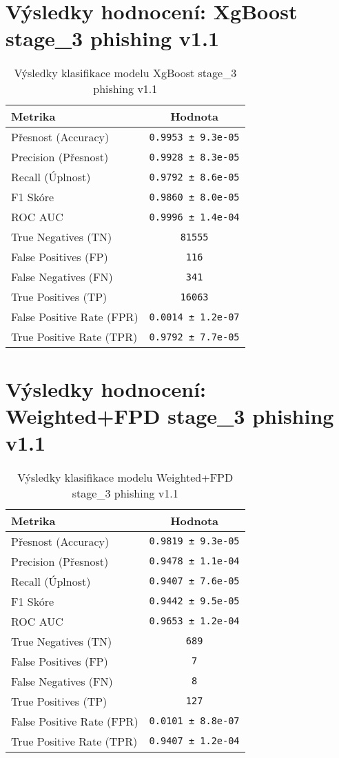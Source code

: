 \section*{Výsledky hodnocení: XgBoost stage_3 phishing v1.1}
\begin{table}[h!]
\centering
\begin{tabular}{|l|c|}
\hline
\textbf{Metrika} & \textbf{Hodnota} \\
\hline
Přesnost (Accuracy) & \texttt{0.9953 ± 9.3e-05} \\
Precision (Přesnost) & \texttt{0.9928 ± 8.3e-05} \\
Recall (Úplnost) & \texttt{0.9792 ± 8.6e-05} \\
F1 Skóre & \texttt{0.9860 ± 8.0e-05} \\
ROC AUC & \texttt{0.9996 ± 1.4e-04} \\
True Negatives (TN) & \texttt{81555} \\
False Positives (FP) & \texttt{116} \\
False Negatives (FN) & \texttt{341} \\
True Positives (TP) & \texttt{16063} \\
False Positive Rate (FPR) & \texttt{0.0014 ± 1.2e-07} \\
True Positive Rate (TPR) & \texttt{0.9792 ± 7.7e-05} \\
\hline
\end{tabular}
\caption{Výsledky klasifikace modelu XgBoost stage_3 phishing v1.1}
\label{tab:phishing_xgboost}
\end{table}

\section*{Výsledky hodnocení: Weighted+FPD stage_3 phishing v1.1}
\begin{table}[h!]
\centering
\begin{tabular}{|l|c|}
\hline
\textbf{Metrika} & \textbf{Hodnota} \\
\hline
Přesnost (Accuracy) & \texttt{0.9819 ± 9.3e-05} \\
Precision (Přesnost) & \texttt{0.9478 ± 1.1e-04} \\
Recall (Úplnost) & \texttt{0.9407 ± 7.6e-05} \\
F1 Skóre & \texttt{0.9442 ± 9.5e-05} \\
ROC AUC & \texttt{0.9653 ± 1.2e-04} \\
True Negatives (TN) & \texttt{689} \\
False Positives (FP) & \texttt{7} \\
False Negatives (FN) & \texttt{8} \\
True Positives (TP) & \texttt{127} \\
False Positive Rate (FPR) & \texttt{0.0101 ± 8.8e-07} \\
True Positive Rate (TPR) & \texttt{0.9407 ± 1.2e-04} \\
\hline
\end{tabular}
\caption{Výsledky klasifikace modelu Weighted+FPD stage_3 phishing v1.1}
\label{tab:phishing_weighted+fpd}
\end{table}

